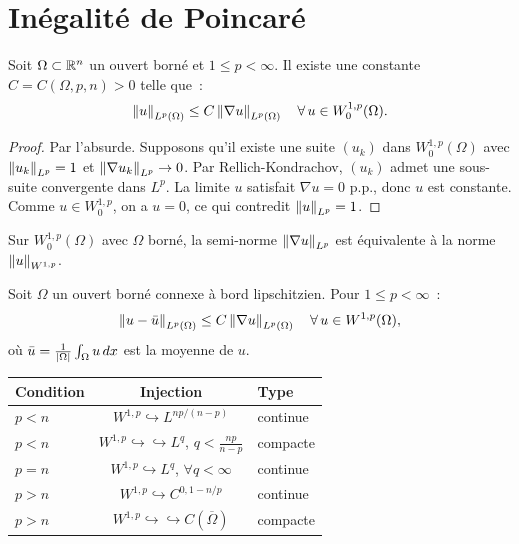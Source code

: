 \section{In\'egalit\'e de Poincar\'e}

\begin{theoreme}
\label{thm:poincare}
Soit $\Omega \subset \mathbb{R}^n$ un ouvert born\'e et $1 \leq p < \infty$. Il existe
une constante $C = C(\Omega, p, n) > 0$ telle que~:
\[
    \left\| u \right\|_{L^p(\Omega)} \leq C \left\| \nabla u \right\|_{L^p(\Omega)}
    \quad \forall\, u \in W_0^{1,p}(\Omega).
\]
\end{theoreme}

\begin{proof}
Par l'absurde. Supposons qu'il existe une suite $(u_k)$ dans $W_0^{1,p}(\Omega)$
avec $\left\| u_k \right\|_{L^p} = 1$ et $\left\| \nabla u_k \right\|_{L^p} \to 0$. Par Rellich-Kondrachov,
$(u_k)$ admet une sous-suite convergente dans $L^p$. La limite $u$ satisfait
$\nabla u = 0$ p.p., donc $u$ est constante. Comme $u \in W_0^{1,p}$, on a $u = 0$,
ce qui contredit $\left\| u \right\|_{L^p} = 1$.
\end{proof}

\begin{corollaire}
Sur $W_0^{1,p}(\Omega)$ avec $\Omega$ born\'e, la semi-norme
$\left\| \nabla u \right\|_{L^p}$ est \'equivalente \`a la norme $\left\| u \right\|_{W^{1,p}}$.
\end{corollaire}

\begin{theoreme}
Soit $\Omega$ un ouvert born\'e connexe \`a bord lipschitzien. Pour
$1 \leq p < \infty$~:
\[
    \left\| u - \bar{u} \right\|_{L^p(\Omega)} \leq C \left\| \nabla u \right\|_{L^p(\Omega)}
    \quad \forall\, u \in W^{1,p}(\Omega),
\]
o\`u $\bar{u} = \frac{1}{\left| \Omega \right|} \int_\Omega u\, dx$ est la moyenne de $u$.
\end{theoreme}

\begin{formules}[title=\textbf{R\'esum\'e des injections de Sobolev ($k=1$)}]
\begin{center}
\renewcommand{\arraystretch}{1.3}
\begin{tabular}{lcl}
\textbf{Condition} & \textbf{Injection} & \textbf{Type} \\
\hline
$p < n$ & $W^{1,p} \hookrightarrow L^{np/(n-p)}$ & continue \\
$p < n$ & $W^{1,p} \hookrightarrow\hookrightarrow L^{q}$, $q < \frac{np}{n-p}$ & compacte \\
$p = n$ & $W^{1,p} \hookrightarrow L^q$, $\forall q < \infty$ & continue \\
$p > n$ & $W^{1,p} \hookrightarrow C^{0,1-n/p}$ & continue \\
$p > n$ & $W^{1,p} \hookrightarrow\hookrightarrow C(\overline{\Omega})$ & compacte \\
\end{tabular}
\end{center}
\end{formules}

